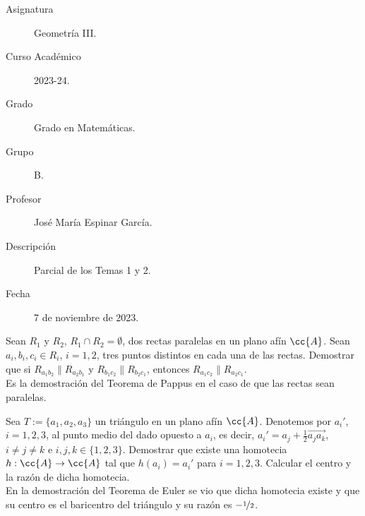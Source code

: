 \documentclass[12pt]{article}
\begin{document}

    
    

    \begin{description}
        \item[Asignatura] Geometría III.
        \item[Curso Académico] 2023-24.
        \item[Grado] Grado en Matemáticas.
        \item[Grupo] B.
        \item[Profesor] José María Espinar García.
        \item[Descripción] Parcial de los Temas 1 y 2.
        \item[Fecha] 7 de noviembre de 2023.
    
    \end{description}
    \newpage
    
    \begin{ejercicio}
        Sean $R_1$ y $R_2$, $R_1\cap R_2=\emptyset$, dos rectas paralelas en un plano afín $\cc{A}$.
        Sean $a_i,b_i,c_i\in R_i$, $i=1,2$, tres puntos distintos en cada una de las rectas.
        Demostrar que si $R_{a_1b_2}\|R_{a_2b_1}$ y $R_{b_1c_2}\|R_{b_2c_1}$, entonces $R_{a_1c_2}\|R_{a_2c_1}$.\\

        Es la demostración del Teorema de Pappus en el caso de que las rectas sean paralelas.
    \end{ejercicio}

    \begin{ejercicio}
        Sea $T:=\{a_1,a_2,a_3\}$ un triángulo en un plano afín $\cc{A}$. Denotemos por $a_i'$, $i=1,2,3$, al punto medio del dado opuesto a $a_i$, es decir, $a_i'=a_j+\frac{1}{2}\vec{a_ja_k}$, $i\neq j\neq k$ e $i,j,k\in \{1,2,3\}$. Demostrar que existe una homotecia $h:\cc{A}\to \cc{A}$ tal que $h(a_i)=a_i'$ para $i=1,2,3$. Calcular el centro y la razón de dicha homotecia.\\

        En la demostración del Teorema de Euler se vio que dicha homotecia existe y que su centro es el baricentro del triángulo y su razón es $-\nicefrac{1}{2}$.
    \end{ejercicio}
\end{document}
